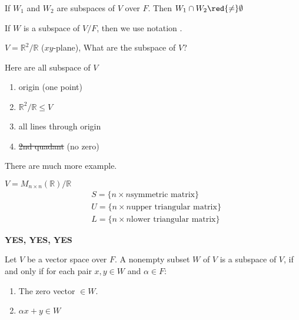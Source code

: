\begin{remark}
    If $W_1$ and $W_2$ are subspaces of $V$ over $F$. Then $W_1 \cap W_2 \red{\neq} \emptyset$
\end{remark}

\begin{note}
If $W$ is a subspace of $V/F$, then we use notation .
\end{note}

\begin{exercise}
$V = \mathbb{R}^2/\mathbb{R}$ ($xy$-plane), What are the subspace of $V$?
\end{exercise}
\begin{answer}
    Here are all subspace of $V$
    \begin{enumerate}[label=(\roman*)]
        \item origin (one point)
        \item $\mathbb{R}^2/\mathbb{R} \leq V$
        \item all lines through origin
        \item \sout{2nd quadant} (no zero)
    \end{enumerate}
    There are much more example.
\end{answer}

\begin{exercise}
$V = M_{n\times n}(\mathbb{R})/\mathbb{R}$
\begin{align*}
    &S = \{n\times n \text{symmetric matrix}\} \\
    &U = \{n\times n \text{upper triangular matrix}\} \\
    &L = \{n\times n \text{lower triangular matrix}\}
\end{align*}
\end{exercise}
\begin{answer}
\textbf{YES, YES, YES}
\end{answer}

\begin{theorem}
    Let $V$ be a vector space over $F$. A nonempty subset $W$ of $V$ is a subspace of $V$, if and only if for each pair $x, y \in W$ and $\alpha \in F$:
    \begin{enumerate}[label=$\arabic*^\circ$]
        \item The zero vector $\in W$.
        \item $\alpha x + y \in W$
    \end{enumerate}
\end{theorem}

